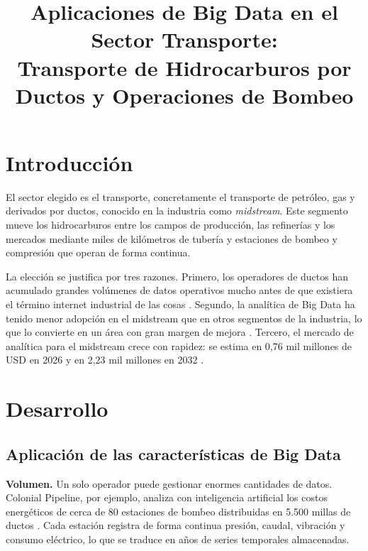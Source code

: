 \documentclass[conference]{IEEEtran}
\begin{document}
\title{Aplicaciones de Big Data en el Sector Transporte:\\
Transporte de Hidrocarburos por Ductos y Operaciones de Bombeo}

\author{
}

\maketitle

\section{Introducción}
El sector elegido es el transporte, concretamente el transporte de petróleo, gas y derivados por ductos, conocido en la industria como \textit{midstream}. Este segmento mueve los hidrocarburos entre los campos de producción, las refinerías y los mercados mediante miles de kilómetros de tubería y estaciones de bombeo y compresión que operan de forma continua.

La elección se justifica por tres razones. Primero, los operadores de ductos han acumulado grandes volúmenes de datos operativos mucho antes de que existiera el término internet industrial de las cosas \cite{aveva}. Segundo, la analítica de Big Data ha tenido menor adopción en el midstream que en otros segmentos de la industria, lo que lo convierte en un área con gran margen de mejora \cite{spe}. Tercero, el mercado de analítica para el midstream crece con rapidez: se estima en 0,76 mil millones de USD en 2026 y en 2,23 mil millones en 2032 \cite{mordor}.

\section{Desarrollo}

\subsection{Aplicación de las características de Big Data}

\textbf{Volumen.} Un solo operador puede gestionar enormes cantidades de datos. Colonial Pipeline, por ejemplo, analiza con inteligencia artificial los costos energéticos de cerca de 80 estaciones de bombeo distribuidas en 5.500 millas de ductos \cite{colonial}. Cada estación registra de forma continua presión, caudal, vibración y consumo eléctrico, lo que se traduce en años de series temporales almacenadas.
\end{document}
